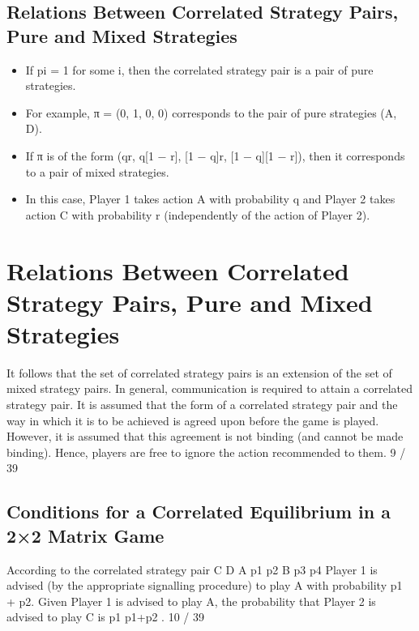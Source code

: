 \documentclass[]{report}
\begin{document}
\subsection{Relations Between Correlated Strategy Pairs, Pure and
Mixed Strategies}
\begin{itemize}
	\item If pi = 1 for some i, then the correlated strategy pair is a pair of
	pure strategies.
	\item 	For example, π = (0, 1, 0, 0) corresponds to the pair of pure
	strategies (A, D).
	\item 	If π is of the form (qr, q[1 − r], [1 − q]r, [1 − q][1 − r]), then it
	corresponds to a pair of mixed strategies.
	\item 	In this case, Player 1 takes action A with probability q and Player
	2 takes action C with probability r (independently of the action of
	Player 2).
\end{itemize}


\section{Relations Between Correlated Strategy Pairs, Pure and
Mixed Strategies}
It follows that the set of correlated strategy pairs is an extension of
the set of mixed strategy pairs.
In general, communication is required to attain a correlated
strategy pair.
It is assumed that the form of a correlated strategy pair and the
way in which it is to be achieved is agreed upon before the game is
played.
However, it is assumed that this agreement is not binding (and
cannot be made binding). Hence, players are free to ignore the
action recommended to them.
9 / 39

\subsection{Conditions for a Correlated Equilibrium in a 2×2 Matrix
Game}
According to the correlated strategy pair
C D
A p1 p2
B p3 p4
Player 1 is advised (by the appropriate signalling procedure) to play
A with probability p1 + p2. Given Player 1 is advised to play A, the
probability that Player 2 is advised to play C is p1
p1+p2
.
10 / 39
\end{document}
